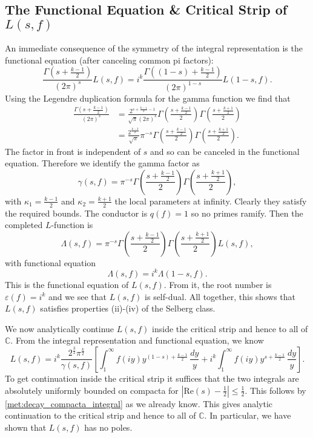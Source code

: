\documentclass[12pt]{book}
\theoremstyle{definition}\newframedtheorem{method}{Method}
\newcommand{\C}{\mathbb{C}}
\newcommand{\g}{\gamma}
\renewcommand{\k}{\kappa}
\newcommand{\G}{\Gamma}
\renewcommand{\L}{\Lambda}
\newcommand{\e}{\varepsilon}
\newcommand{\<}{\langle}
\renewcommand{\>}{\rangle}
\renewcommand{\Re}{\mathrm{Re}}
\begin{document}
    \subsection*{The Functional Equation \& Critical Strip of \texorpdfstring{$L(s,f)$}{L(s,f)}}
      An immediate consequence of the symmetry of the integral representation is the functional equation (after canceling common pi factors):
      \[
        \frac{\G(s+\frac{k-1}{2})}{(2\pi)^{s}}L(s,f) = i^{k}\frac{\G((1-s)+\frac{k-1}{2})}{(2\pi)^{1-s}}L(1-s,f).
      \]
      Using the Legendre duplication formula for the gamma function we find that
      \begin{align*}
        \frac{\G\left(s+\frac{k-1}{2}\right)}{(2\pi)^{s}} &= \frac{2^{s+\frac{k-1}{2}-1}}{\sqrt{\pi}(2\pi)^{s}}\G\left(\frac{s+\frac{k-1}{2}}{2}\right)\G\left(\frac{s+\frac{k+1}{2}}{2}\right) \\
        &= \frac{2^{\frac{k-3}{2}}}{\sqrt{\pi}}\pi^{-s}\G\left(\frac{s+\frac{k-1}{2}}{2}\right)\G\left(\frac{s+\frac{k+1}{2}}{2}\right).
      \end{align*}
      The factor in front is independent of $s$ and so can be canceled in the functional equation. Therefore we identify the gamma factor as
      \[
        \g(s,f) = \pi^{-s}\G\left(\frac{s+\frac{k-1}{2}}{2}\right)\G\left(\frac{s+\frac{k+1}{2}}{2}\right),
      \]
      with $\k_{1} = \frac{k-1}{2}$ and $\k_{2} = \frac{k+1}{2}$ the local parameters at infinity. Clearly they satisfy the required bounds. The conductor is $q(f) = 1$ so no primes ramify. Then the completed $L$-function is
      \[
        \L(s,f) = \pi^{-s}\G\left(\frac{s+\frac{k-1}{2}}{2}\right)\G\left(\frac{s+\frac{k+1}{2}}{2}\right)L(s,f),
      \]
      with functional equation
      \[
        \L(s,f) = i^{k}\L(1-s,f).
      \]
      This is the functional equation of $L(s,f)$. From it, the root number is $\e(f) = i^{k}$ and we see that $L(s,f)$ is self-dual. All together, this shows that $L(s,f)$ satisfies properties (ii)-(iv) of the Selberg class.

      We now analytically continue $L(s,f)$ inside the critical strip and hence to all of $\C$. From the integral representation and functional equation, we know
      \begin{equation}\label{equ:integral_representation_L-function_2}
        L(s,f) = i^{k}\frac{2^{\frac{3}{2}}\pi^{\frac{k}{2}}}{\g(s,f)}\left[\int_{1}^{\infty}f(iy)y^{(1-s)+\frac{k-1}{2}}\,\frac{dy}{y}+i^{k}\int_{1}^{\infty}f(iy)y^{s+\frac{k-1}{2}}\,\frac{dy}{y}\right].
      \end{equation}
      To get continuation inside the critical strip it suffices that the two integrals are absolutely uniformly bounded on compacta for $|\Re(s)-\frac{1}{2}| \le \frac{1}{2}$. This follows by \cref{met:decay_compacta_integral} as we already know. This gives analytic continuation to the critical strip and hence to all of $\C$. In particular, we have shown that $L(s,f)$ has no poles.
\end{document}
